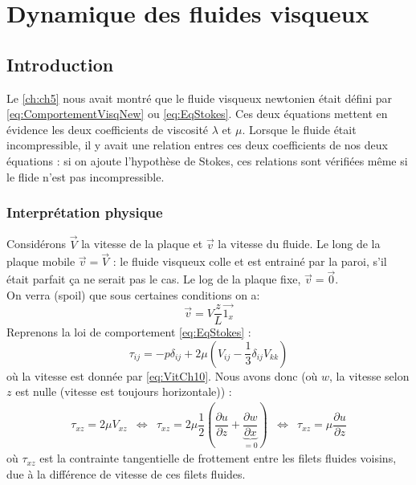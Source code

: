 \chapter{Dynamique des fluides visqueux}
\section{Introduction}
Le \autoref{ch:ch5} nous avait montré que le fluide visqueux newtonien était défini par \autoref{eq:ComportementVisqNew} ou \autoref{eq:EqStokes}. Ces deux équations mettent 
en évidence les deux coefficients de viscosité $\lambda$ et $\mu$. Lorsque le fluide 
était incompressible, il y avait une relation entres ces deux coefficients de nos deux
équations : si on ajoute l'hypothèse de Stokes, ces relations sont vérifiées même si le
flide n'est pas incompressible.


	\subsection{Interprétation physique}
	Considérons $\vec{V}$ la vitesse de la plaque et $\vec{v}$ la vitesse du fluide. Le
	long de la plaque mobile $\vec{v}=\vec{V}$ : le fluide visqueux colle et est entrainé
	par la paroi, s'il était parfait ça ne serait pas le cas. Le log de la plaque fixe,
	$\vec{v}=\vec{0}$.\\
	
	On verra (spoil) que sous certaines conditions on a: 
	\begin{equation}
	\vec{v} = V\frac{z}{L}\vec{1_x}
	\label{eq:VitCh10}
	\end{equation}
	Reprenons la loi de comportement \autoref{eq:EqStokes} :
	\begin{equation}
	\tau_{ij} = -p\delta_{ij} + 2\mu\left(V_{ij} - \frac{1}{3}\delta_{ij}V_{kk}\right)
	\end{equation}
	où la vitesse est donnée par \autoref{eq:VitCh10}. Nous avons donc (où $w$, la vitesse
	selon $z$ est nulle (vitesse est toujours horizontale)) :
	\begin{equation}
	\begin{array}{ccccc}
	\tau_{xz} = 2\mu V_{xz} &\Leftrightarrow & \tau_{xz} = 2\mu\dfrac{1}{2}\left(\dfrac{
	\partial u}{\partial z}+\underbrace{\dfrac{\partial w}{\partial x}}_{=0}\right) &
	\Leftrightarrow & \tau_{xz}	= \mu \dfrac{\partial u}{\partial z}
	\end{array}
	\end{equation}
	où $\tau_{xz}$ est la contrainte tangentielle de frottement entre les filets fluides
	voisins, due à la différence de vitesse de ces filets fluides.
	
